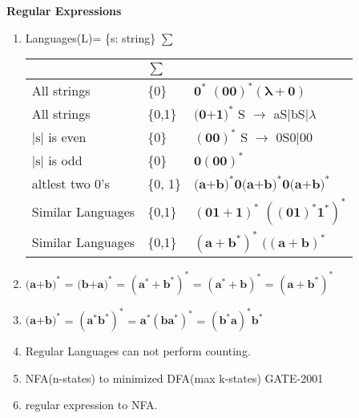 
\centerline{\textbf{ \LARGE Regular Expressions }}

\begin{enumerate}
    \item Languages(L)= \{s: string\} \(\sum\)

    \begin{myTableStyle} \begin{tabular}{ |m{4cm}|m{1cm}|m{10cm}| } \hline
        & \(\sum\) & \\ \hline
        All strings  &\{0\} &    \( \mathbf {0^*} \)  \quad \( \mathbf {(00)^*(\lambda+0)} \)  \\ \hline
        All strings  &\{0,1\} &    \( \mathbf {\text{(0+1)}^*} \)   \quad S \(\rightarrow\) aS\(|\)bS\(| \lambda \) \\ \hline
         \(   \left | \text{s}  \right | \)  is even & \{0\} &  \( \mathbf {(00)^*} \) \quad S \(\rightarrow\) 0S0\(|\)00 \\ \hline
        \(   \left | \text{s}  \right | \)  is odd & \{0\} &  \( \mathbf {0(00)^*} \) \\ \hline
        altlest two 0's & \{0, 1\} &  \( \mathbf { \text{(a+b)}^* \text{0} \text{(a+b)}^* \text{0} \text{(a+b)}^*} \) \\ \hline
          Similar Languages  &\{0,1\} & \( \mathbf {(01 + 1)^*} \) \quad \( \mathbf {((01)^*1^*)^*} \) \\ \hline
          Similar Languages  &\{0,1\} & \( \mathbf {(a + b^*)^*} \) \quad \( \mathbf {((a+b)^*} \) \\ \hline
    \end{tabular} \end{myTableStyle} \vspace{0.08in}
    \item \( \mathbf { \text{(a+b)}^* } \) = \( \mathbf { \text{(b+a)}^* } \)
        = \( \mathbf { (\text{a}^* + \text{b}^*)^*} \) = \( \mathbf { (\text{a}^* + \text{b})^*} \)  = \( \mathbf { (\text{a} + \text{b}^*)^*} \)
    \item \( \mathbf { \text{(a+b)}^* } \) = \( \mathbf { (\text{a}^*\text{b}^*)^*} \) = \( \mathbf { \text{a}^* (\text{b}\text{a}^*)^* } \)
        = \( \mathbf { (\text{b}^*\text{a})^* \text{b}^* } \)
    \item Regular Languages can not perform counting.
    \item NFA(n-states) to minimized DFA(max k-states) GATE-2001
    \item regular expression to NFA.
\end{enumerate}


\begin{comment}

    \( \mathbf {  } \)  \text{a}^\text{b}  \text{a}^*

    (00)^*   \lambda   \phi

\end{comment}

